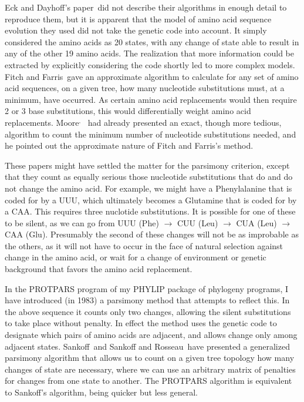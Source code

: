\documentclass[12pt]{article}
\def\fn{\footnotemark\ }
\begin{document}
Eck and Dayhoff's paper\footnotemark[1]\ did not describe their algorithms in enough
detail to reproduce them, but it is apparent that the model of amino acid
sequence evolution they used did not take the genetic code into account.  It
simply considered the amino acids as 20 states, with any change of state able
to result in any of the other 19 amino acids.  The realization that more
information could be extracted by explicitly considering the code shortly led
to more complex models.  Fitch and Farris\fn gave an approximate
algorithm to calculate for any set of amino acid sequences, on a given tree,
how many nucleotide substitutions must, at a minimum, have occurred.  As
certain amino acid replacements would then require 2 or 3 base substitutions,
this would differentially weight amino acid replacements.  Moore\footnotemark$^,$\fn
had already presented an exact, though more
tedious, algorithm to count the minimum number of nucleotide substitutions
needed, and he pointed out the approximate nature of Fitch and Farris's
method\footnotemark.

These papers might have settled the matter for the parsimony criterion, except
that they count as equally serious those nucleotide substitutions that do and
do not change the amino acid.  For example, we might have a Phenylalanine
that is coded for by a UUU, which ultimately becomes a Glutamine that is coded for by
a CAA.  This requires three nuclotide substitutions.  It is possible for
one of these to be silent, as we can go from UUU (Phe) $\rightarrow$ CUU (Leu)
 $\rightarrow$ CUA (Leu) $\rightarrow$ CAA (Glu).  Presumably the second
of these changes will not be as improbable as the others, as it will not have
to occur in the face of natural selection against change in the amino
acid, or wait for a change of environment or genetic background that
favors the amino acid replacement.

In the PROTPARS program of my PHYLIP package of phylogeny programs, I have
introduced (in 1983) a parsimony method that attempts to reflect
this.  In the above sequence
it counts only two changes, allowing the silent substitutions to take place
without penalty.  In effect the method uses the genetic code to designate which
pairs of amino acids are adjacent, and allows change only among adjacent
states.  Sankoff\fn and Sankoff and Rosseau\fn have presented a
generalized parsimony algorithm that allows us to count on a given tree
topology how many changes of state are necessary, where we can use an arbitrary
matrix of penalties for changes from one state to another.  
The PROTPARS algorithm is equivalent to Sankoff's algorithm, being quicker but
less general. 
\end{document}
